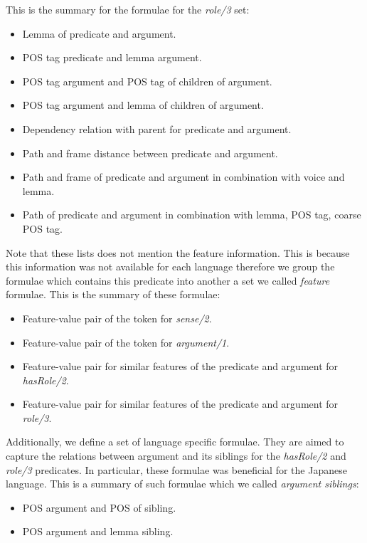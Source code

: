 This is the summary for the formulae for the \emph{role/3} set:
\begin{itemize}\addtolength{\itemsep}{-0.5\baselineskip}
    \item Lemma of predicate and argument.
    \item POS tag predicate and lemma argument.
    \item POS tag argument and POS tag of children of argument.
    \item POS tag argument and lemma  of children of argument.
    \item Dependency relation with parent for predicate and argument.
    \item Path and frame distance between predicate and argument.
    \item Path and frame of predicate and argument in combination with voice and 
        lemma.
    \item Path of predicate and argument in combination with lemma, POS tag, 
        coarse POS tag.
\end{itemize}

Note that these lists does not mention the feature information. This is because 
this information was not available for each language therefore we  group the 
formulae which contains this predicate into another a set we called 
\emph{feature} formulae. This is the summary of these formulae:
\begin{itemize}\addtolength{\itemsep}{-0.5\baselineskip}
    \item Feature-value pair of the token for \emph{sense/2}.
    \item Feature-value pair of the token for \emph{argument/1}.
    \item Feature-value pair for similar features of the predicate and argument 
        for \emph{hasRole/2}.
    \item Feature-value pair for similar features of the predicate and argument 
        for \emph{role/3}.
\end{itemize}

Additionally, we define a set of language specific formulae. They are aimed to 
capture the relations between argument and its siblings for the \emph{hasRole/2} 
and \emph{role/3} predicates.  In particular, these formulae was beneficial for 
the Japanese language.  This is a summary of such formulae which we called 
\emph{argument siblings}:
\begin{itemize}\addtolength{\itemsep}{-0.5\baselineskip}
    \item POS argument and POS of sibling.
    \item POS argument and lemma sibling.
\end{itemize}


